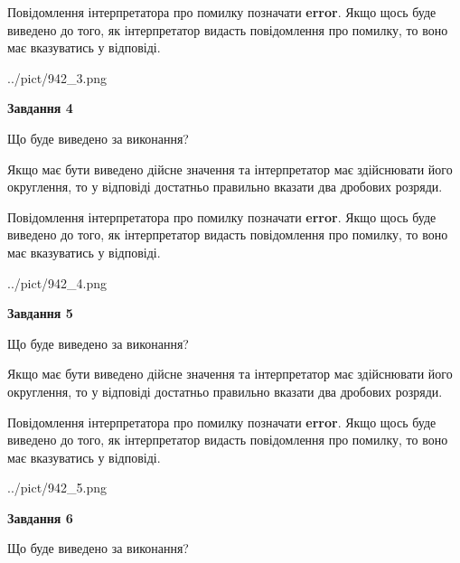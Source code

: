 \documentclass[12pt, ukrainian]{article}
\begin{document}
{\begin {Large}
Повідомлення інтерпретатора про помилку позначати \textbf{error}.
Якщо щось буде виведено до того, як інтерпретатор видасть повідомлення про помилку, 
то воно має вказуватись у відповіді. \par

\begin{center}
	{../pict/942_3.png}
\end{center}
\newpage

{\begin {center}\textbf{Завдання 4}\end {center}}\par
Що буде виведено за виконання? \par

Якщо має бути виведено дійсне значення та інтерпретатор має здійснювати його округлення, 
то у відповіді достатньо правильно вказати два дробових розряди.

Повідомлення інтерпретатора про помилку позначати \textbf{error}.
Якщо щось буде виведено до того, як інтерпретатор видасть повідомлення про помилку, 
то воно має вказуватись у відповіді. \par

\begin{center}
	{../pict/942_4.png}
\end{center}
\newpage

{\begin {center}\textbf{Завдання 5}\end {center}}\par
Що буде виведено за виконання? \par

Якщо має бути виведено дійсне значення та інтерпретатор має здійснювати його округлення, 
то у відповіді достатньо правильно вказати два дробових розряди.

Повідомлення інтерпретатора про помилку позначати \textbf{error}.
Якщо щось буде виведено до того, як інтерпретатор видасть повідомлення про помилку, 
то воно має вказуватись у відповіді. \par

\begin{center}
	{../pict/942_5.png}
\end{center}
\newpage

{\begin {center}\textbf{Завдання 6}\end {center}}\par
Що буде виведено за виконання? \par


\end{Large}}
\end{document}
